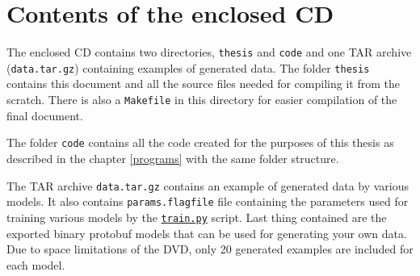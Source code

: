 \chapter{Contents of the enclosed CD} \label{cd}

The enclosed CD contains two directories, \texttt{thesis} and \texttt{code} and one TAR archive (\texttt{data.tar.gz}) containing examples of generated data. The folder \texttt{thesis} contains this document and all the source files needed for compiling it from the scratch. There is also a \texttt{Makefile} in this directory for easier compilation of the final document.

The folder \texttt{code} contains all the code created for the purposes of this thesis as described in the chapter \ref{programs} with the same folder structure.

The TAR archive \texttt{data.tar.gz} contains an example of generated data by various models. It also contains \texttt{params.flagfile} file containing the parameters used for training various models by the \hyperref[trainpy]{\texttt{train.py}} script. Last thing contained are the exported binary protobuf models that can be used for generating your own data. Due to space limitations of the DVD, only 20 generated examples are included for each model.

